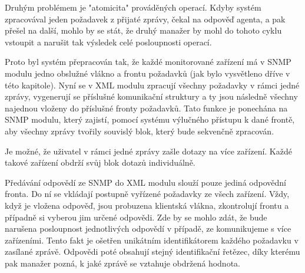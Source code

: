 Druhým problémem je "atomicita" prováděných operací. Kdyby systém zpracovával jeden požadavek z přijaté zprávy, čekal na odpověď agenta, a pak
přešel na další, mohlo by se stát, že druhý manažer by mohl do tohoto cyklu vstoupit a narušit tak výsledek celé posloupnosti operací.

Proto byl systém přepracován tak, že každé monitorované zařízení má v SNMP modulu jedno obslužné vlákno a frontu požadavků (jak bylo vysvětleno 
dříve v této kapitole). Nyní se v XML modulu zpracují všechny požadavky v rámci jedné zprávy, vygenerují se příslušné komunikační struktury a ty jsou
následně všechny najednou vloženy do příslušné fronty požadavků. Tato funkce je ponechána na SNMP modulu, který zajistí, pomocí systému výlučného přístupu
k dané frontě, aby všechny zprávy tvořily souvislý blok, který bude sekvenčně zpracován.

Je možné, že uživatel v rámci jedné zprávy zašle dotazy na více zařízení. Každé takové zařízení obdrží svůj blok dotazů individuálně.

Předávání odpovědí ze SNMP do XML modulu slouží pouze jediná odpovědní fronta. Do ní se vkládají postupně vyřízené požadavky ze všech zařízení.
Vždy, když je vložena odpověď, jsou probuzena klientská vlákna, zkontrolují frontu a případně si vyberou jim určené odpovědi. Zde by se mohlo zdát,
že bude narušena posloupnost jednotlivých odpovědí v případě, ze komunikujeme s více zařízeními. Tento fakt je ošetřen unikátním identifikátorem každého
požadavku v zasílané zprávě. Odpovědi poté obsahují stejný identifikační řetězec, díky kterému pak manažer pozná, k jaké zprávě se vztahuje obdržená hodnota.

